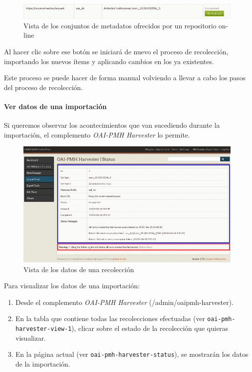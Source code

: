 \documentclass[
]{article}
\providecommand{\tightlist}{%
  \setlength{\itemsep}{0pt}\setlength{\parskip}{0pt}}
\begin{document}
\begin{figure}
\hypertarget{re-harvest-button}{%
\centering
\includegraphics{../_static/images/re-harvest-button.png}
\caption{Vista de los conjuntos de metadatos ofrecidos por un
repositorio on-line}\label{re-harvest-button}
}
\end{figure}

Al hacer clic sobre ese botón se iniciará de nuevo el proceso de
recolección, importando los nuevos ítems y aplicando cambios en los ya
existentes.

Este proceso se puede hacer de forma manual volviendo a llevar a cabo
los pasos del proceso de recolección.

\hypertarget{ver-datos-de-una-importaciuxf3n}{%
\paragraph{Ver datos de una
importación}\label{ver-datos-de-una-importaciuxf3n}}

Si queremos observar los acontecimientos que van sucediendo durante la
importación, el complemento \emph{OAI-PMH Harvester} lo permite.

\begin{figure}
\hypertarget{oai-pmh-harvester-status}{%
\centering
\includegraphics{../_static/images/oai-pmh-harvester-status.png}
\caption{Vista de los datos de una
recolección}\label{oai-pmh-harvester-status}
}
\end{figure}

Para visualizar los datos de una importación:

\begin{enumerate}
\def\labelenumi{\arabic{enumi}.}
\tightlist
\item
  Desde el complemento \emph{OAI-PMH Harvester}
  ({/admin/oaipmh-harvester}).
\item
  En la tabla que contiene todas las recolecciones efectuadas (ver
  \texttt{oai-pmh-harvester-view-1}), clicar sobre el estado de la
  recolección que quieras visualizar.
\item
  En la página actual (ver \texttt{oai-pmh-harvester-status}), se
  mostrarán los datos de la importación.
\end{enumerate}
\end{document}
